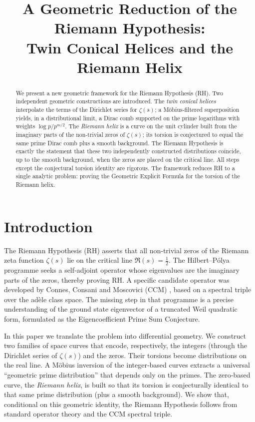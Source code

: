 \documentclass[12pt,a4paper]{article}
\title{\bf A Geometric Reduction of the Riemann Hypothesis:\\ 
Twin Conical Helices and the Riemann Helix}
\author{}
\date{}
\begin{document}
\maketitle

\begin{abstract}
We present a new geometric framework for the Riemann Hypothesis (RH).  Two independent geometric constructions are introduced.  
The \emph{twin conical helices} interpolate the terms of the Dirichlet series for $\zeta(s)$; a M\"obius‑filtered superposition yields, in a distributional limit, a Dirac comb supported on the prime logarithms with weights $\log p/p^{m/2}$.  
The \emph{Riemann helix} is a curve on the unit cylinder built from the imaginary parts of the non‑trivial zeros of $\zeta(s)$; its torsion is conjectured to equal the same prime Dirac comb plus a smooth background.  
The Riemann Hypothesis is exactly the statement that these two independently constructed distributions coincide, up to the smooth background, when the zeros are placed on the critical line.  
All steps except the conjectural torsion identity are rigorous.  The framework reduces RH to a single analytic problem: proving the Geometric Explicit Formula for the torsion of the Riemann helix.
\end{abstract}

\section{Introduction}
The Riemann Hypothesis (RH) asserts that all non‑trivial zeros of the Riemann zeta function $\zeta(s)$ lie on the critical line $\Re(s)=\frac12$.  The Hilbert--P\'olya programme seeks a self‑adjoint operator whose eigenvalues are the imaginary parts of the zeros, thereby proving RH.  A specific candidate operator was developed by Connes, Consani and Moscovici (CCM) \cite{CCM}, based on a spectral triple over the adèle class space.  The missing step in that programme is a precise understanding of the ground state eigenvector of a truncated Weil quadratic form, formulated as the Eigencoefficient Prime Sum Conjecture.

In this paper we translate the problem into differential geometry.  We construct two families of space curves that encode, respectively, the integers (through the Dirichlet series of $\zeta(s)$) and the zeros.  Their torsions become distributions on the real line.  A M\"obius inversion of the integer‑based curves extracts a universal ``geometric prime distribution'' that depends only on the primes.  The zero‑based curve, the \emph{Riemann helix}, is built so that its torsion is conjecturally identical to that same prime distribution (plus a smooth background).  We show that, conditional on this geometric identity, the Riemann Hypothesis follows from standard operator theory and the CCM spectral triple.  
\end{document}
